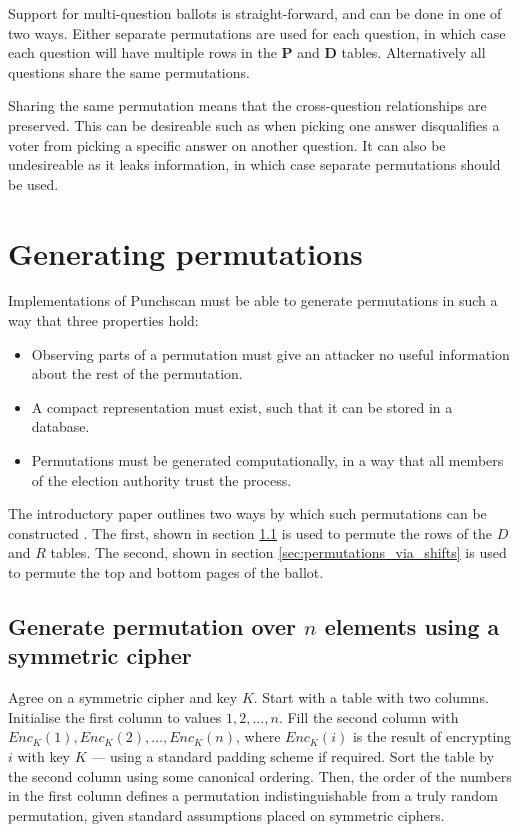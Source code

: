 Support for multi-question ballots is straight-forward, and can be done in one
of two ways. Either separate permutations are used for each question, in which
case each question will have multiple rows in the \textbf{P} and \textbf{D}
tables. Alternatively all questions share the same permutations.

Sharing the same permutation means that the cross-question relationships are
preserved. This can be desireable such as when picking one answer disqualifies
a voter from picking a specific answer on another question. It can also be
undesireable as it leaks information, in which case separate permutations
should be used.

\section{Generating permutations}
\label{sec:generating_permutations}

Implementations of Punchscan must be able to generate permutations in such a
way that three properties hold:
\begin{itemize}
	\item Observing parts of a permutation must give an attacker no useful information about the rest of the permutation.
	\item A compact representation must exist, such that it can be stored in a database.
	\item Permutations must be generated computationally, in a way that all
		members of the election authority trust the process.
\end{itemize}

The introductory paper outlines two ways by which such permutations can be
constructed \autocite[section 8]{fisherPunchscanIntroductionSystem2006}. The
first, shown in section \ref{sec:permutations_via_symmetric_cipher} is used to
permute the rows of the $D$ and $R$ tables. The second, shown in section
\ref{sec:permutations_via_shifts} is used to permute the top and bottom pages
of the ballot.

\subsection{Generate permutation over $n$ elements using a symmetric cipher}
\label{sec:permutations_via_symmetric_cipher}

Agree on a symmetric cipher and key $K$. Start with a table with two columns.
Initialise the first column to values $1, 2, \ldots, n$. Fill the second column
with $Enc_K(1), Enc_K(2), \ldots, Enc_K(n)$, where $Enc_K(i)$ is the result of
encrypting $i$ with key $K$ --- using a standard padding scheme if required.
Sort the table by the second column using some canonical ordering. Then, the
order of the numbers in the first column defines a permutation
indistinguishable from a truly random permutation, given standard assumptions
placed on symmetric ciphers.

